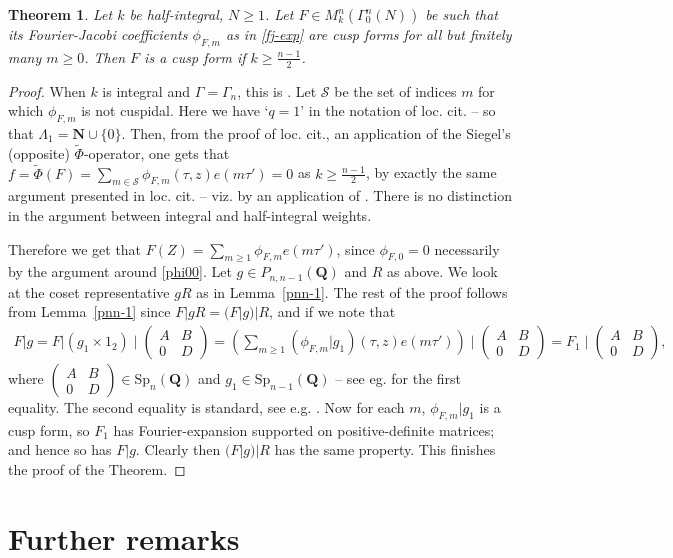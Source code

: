 \documentclass[12pt]{amsart}
\numberwithin{equation}{section}
\theoremstyle{plain}
\newtheorem{thm}{Theorem}[section]
\newcommand{\lemref}[1]{Lemma~\ref{#1}}
\theoremstyle{definition}
\newcommand*{\Q}{\mathbf{Q}}
\newcommand{\mf}{\mathbf}
\newcommand{\mc}{\mathcal}
\newcommand{\mrm}{\mathrm}
\newcommand{\sumn}{\sum \nolimits}
\newcommand{\psmb}{\left( \begin{smallmatrix}}
\newcommand{\psme}{ \end{smallmatrix} \right) }
\begin{document}
\begin{thm} \label{fjcusp}
Let $k$ be half-integral, $N \ge 1$. Let $F \in M_k^n(\Gamma_0^n(N))$ be such that 
its Fourier-Jacobi coefficients $\phi_{F, m}$ as in \eqref{fj-exp} are cusp 
forms for all but finitely many $m \ge 0$.
Then $F$ is a cusp form if $k\geq \frac{n-1}{2}$. 
\end{thm}

\begin{proof}
When $k$ is integral and $\Gamma= \Gamma_n$, this is \cite[Theorem~5.7]{bo-das1}. Let $\mc S$ be the set of indices $m$ for which $\phi_{F,m}$ is not cuspidal. Here we have `$q=1$' in the notation of loc. cit. -- so that $\Lambda_1= \mf N \cup \{ 0 \}$.
Then, from the proof of loc. cit., an application of the Siegel's (opposite) $\widetilde{\Phi}$-operator, one gets that $\displaystyle f= \widetilde{\Phi}(F) = \sumn_{m \in \mc S} \phi_{F,m}(\tau,z) e(m \tau')=0$ as $ k \geq \frac{n-1}{2}$, by exactly the same argument presented in loc. cit. -- viz. by an application of \cite[Lemma~5.6]{bo-das1}.
There is no distinction in the argument between integral and half-integral weights.

Therefore we get that $F(Z)=\sum_{m \ge 1} \phi_{F,m} e(m \tau')$, since $\phi_{F,0}=0$ necessarily by the argument around \eqref{phi00}. Let $g \in P_{n,n-1}(\Q)$ and $R$ as above. We look at the coset representative $gR$ as in \lemref{pnn-1}.
The rest of the proof follows from \lemref{pnn-1} since $F|gR=(F|g)|R $, and if we note that
\begin{align}
F|g = F|   (g_1 \times 1_2) \mid \psmb A & B \\ 0 & D \psme = \left( \sumn_{m \ge 1} (\phi_{F,m}|g_1 )(\tau,z) e(m \tau') \right) \mid \psmb A & B \\ 0 & D \psme = F_1 \mid \psmb A & B \\ 0 & D \psme ,
\end{align}
where $\psmb A & B \\ 0 & D \psme \in \mrm{Sp}_n(\Q)$ and $g_1 \in \mrm{Sp}_{n-1}(\Q)$ -- see eg. \cite[p.~476]{dulinski} for the first equality. The second equality is standard, see e.g. \cite[p.~149]{Ibu-SK}. Now for each $m$,  $ \phi_{F,m}|g_1$ is a cusp form, so $F_1$ has Fourier-expansion supported on positive-definite matrices; and hence so has $F|g$. Clearly then $(F|g)|R$ has the same property. This finishes the proof of the Theorem.
\end{proof}



\section{Further remarks} \label{disc}
\end{document}
